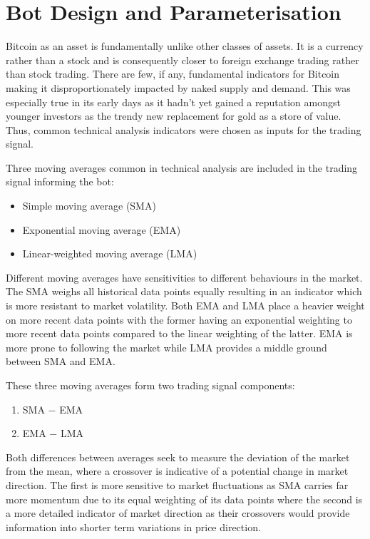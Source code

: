 \documentclass[a4paper, 12pt]{extarticle}
\begin{document}
\section{Bot Design and Parameterisation}
Bitcoin as an asset is fundamentally unlike other classes of assets. It is a currency rather than a stock and is consequently closer to foreign exchange trading rather than stock trading. There are few, if any, fundamental indicators for Bitcoin making it disproportionately impacted by naked supply and demand. This was especially true in its early days as it hadn't yet gained a reputation amongst younger investors as the trendy new replacement for gold as a store of value. Thus, common technical analysis indicators were chosen as inputs for the trading signal. 

Three moving averages common in technical analysis \cite{brock1992simple} are included in the trading signal informing the bot: 

\begin{itemize}
    \item Simple moving average (SMA) 
    \item Exponential moving average (EMA) 
    \item Linear-weighted moving average (LMA) 
\end{itemize}

Different moving averages have sensitivities to different behaviours in the market. The SMA weighs all historical data points equally resulting in an indicator which is more resistant to market volatility. Both EMA and LMA place a heavier weight on more recent data points with the former having an exponential weighting to more recent data points compared to the linear weighting of the latter. EMA is more prone to following the market while LMA provides a middle ground between SMA and EMA. 

These three moving averages form two trading signal components: 

\begin{enumerate}
    \item SMA $-$ EMA 
    \item EMA $-$ LMA 
\end{enumerate}

Both differences between averages seek to measure the deviation of the market from the mean, where a crossover is indicative of a potential change in market direction. The first is more sensitive to market fluctuations as SMA carries far more momentum due to its equal weighting of its data points where the second is a more detailed indicator of market direction as their crossovers would provide information into shorter term variations in price direction. 
\end{document}
